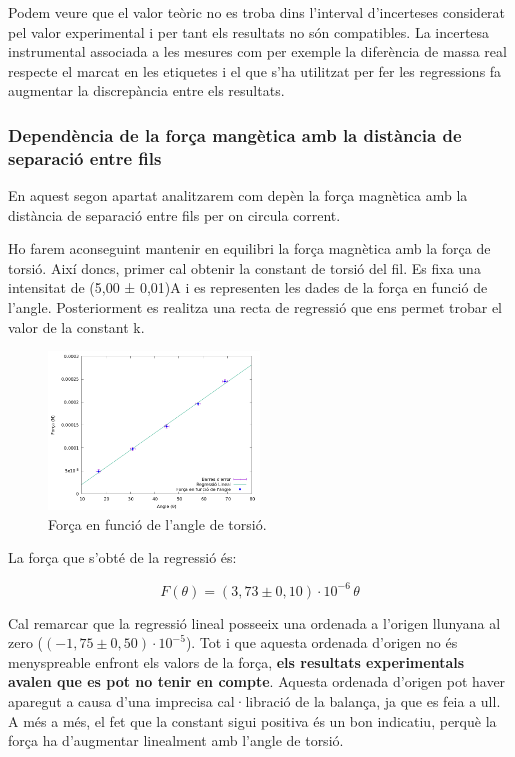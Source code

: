 \documentclass[11pt]{article}
\numberwithin{equation}{section}
\numberwithin{figure}{section}
\numberwithin{table}{section}
\begin{document}
Podem veure que el valor teòric no es troba dins l’interval d’incerteses considerat pel valor experimental i per tant els resultats no són compatibles. La incertesa instrumental associada a les mesures com per exemple la diferència de massa real respecte el marcat en les etiquetes i el que s'ha utilitzat per fer les regressions fa augmentar la discrepància entre els resultats. 

\subsubsection{Dependència de la força mangètica amb la distància de separació entre fils}\label{sec: PR2_Fm_sep}

En aquest segon apartat analitzarem com depèn la força magnètica amb la distància de separació entre fils per on circula corrent. 

Ho farem aconseguint mantenir en equilibri la força magnètica amb la força de torsió. Així doncs, primer cal obtenir la constant de torsió del fil. Es fixa una intensitat de (5,00 ± 0,01)A i es representen les dades de la força en funció de l’angle. Posteriorment es realitza una recta de regressió que ens permet trobar el valor de la constant k.

\begin{figure}[H]
    \centering
    \includegraphics[width=0.5\textwidth]{PR2_regr_Fvstheta.png}
    \caption{Força en funció de l'angle de torsió.}
    \label{fig: PR2_regr_Fvstheta}
\end{figure}

La força que s’obté de la regressió és:

\begin{equation}\label{F_ktheta}
    F(\theta) = (3,73 \pm 0,10) \cdot 10^{-6}\, \theta
\end{equation}

Cal remarcar que la regressió lineal posseeix una ordenada a l’origen llunyana al zero ($(-1,75 \pm 0,50)·10^{-5}$). Tot i que aquesta ordenada d’origen no és menyspreable enfront els valors de la força,\textbf{ els resultats experimentals avalen que es pot no tenir en compte}. Aquesta ordenada d'origen pot haver aparegut a causa d’una imprecisa cal·libració de la balança, ja que es feia a ull. A més a més, el fet que la constant sigui positiva és un bon indicatiu, perquè la força ha d’augmentar linealment amb l’angle de torsió.
\end{document}
